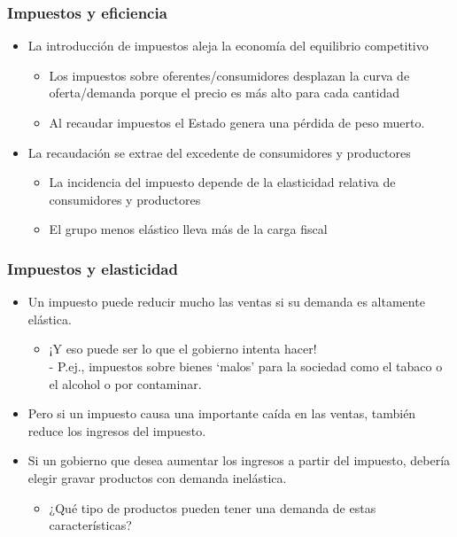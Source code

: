 \documentclass{beamer}
\begin{document}
\begin{frame}
\frametitle{Impuestos y eficiencia}
\begin{itemize}
    \item La introducción de impuestos aleja la economía del equilibrio competitivo\vspace{2mm}
    \begin{itemize}
        \item Los impuestos sobre oferentes/consumidores desplazan la curva de oferta/demanda porque el precio es más alto para cada cantidad
        \item Al recaudar impuestos el Estado genera una pérdida de peso muerto.\vspace{4mm}
    \end{itemize}
    \item La recaudación se extrae del excedente de consumidores y productores
    \begin{itemize}
        \item La incidencia del impuesto depende de la elasticidad relativa de consumidores y productores
        \item El grupo menos elástico lleva más de la carga fiscal
    \end{itemize}
\end{itemize}
\end{frame}


\begin{frame}
\frametitle{Impuestos y elasticidad}
\begin{itemize}
    \item Un impuesto puede reducir mucho las ventas si su demanda es altamente elástica.\vspace{2mm}
    \begin{itemize}
        \item ¡Y eso puede ser lo que el gobierno intenta hacer! \\
        - P.ej., impuestos sobre bienes ‘malos’ para la sociedad como el tabaco o el alcohol o por contaminar.\vspace{4mm}
    \end{itemize}
    \item Pero si un impuesto causa una importante caída en las ventas, también reduce los ingresos del impuesto.\vspace{4mm}
    \item Si un gobierno que desea aumentar los ingresos a partir del impuesto, debería elegir gravar productos con demanda inelástica.\vspace{4mm}
    \begin{itemize}
        \item ¿Qué tipo de productos pueden tener una demanda de estas características?
    \end{itemize}
\end{itemize}
\end{frame}
\end{document}
